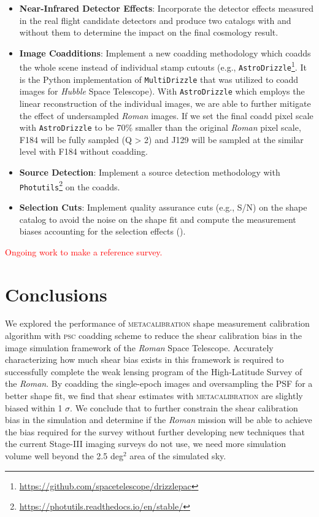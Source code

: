 {\begin{itemize}
    \item \textbf{Near-Infrared Detector Effects}: Incorporate the detector effects measured in the real flight candidate detectors and produce two catalogs with and without them to determine the impact on the final cosmology result.
    
    \item \textbf{Image Coadditions}: Implement a new coadding methodology which coadds the whole scene instead of individual stamp cutouts (e.g., \texttt{AstroDrizzle}\footnote{\url{https://github.com/spacetelescope/drizzlepac}}. It is the Python implementation of \texttt{MultiDrizzle} that was utilized to coadd images for \emph{Hubble} Space Telescope). With \texttt{AstroDrizzle} which employs the linear reconstruction of the individual images, we are able to further mitigate the effect of undersampled \emph{Roman} images. If we set the final coadd pixel scale with \texttt{AstroDrizzle} to be 70\% smaller than the original \emph{Roman} pixel scale, F184 will be fully sampled (Q > 2) and J129 will be sampled at the similar level with F184 without coadding. 
    
    \item \textbf{Source Detection}: Implement a source detection methodology with \texttt{Photutils}\footnote{\url{https://photutils.readthedocs.io/en/stable/}} on the coadds.
    
    \item \textbf{Selection Cuts}: Implement quality assurance cuts (e.g., S/N) on the shape catalog to avoid the noise on the shape fit and compute the measurement biases accounting for the selection effects (\citealt{2017ApJ...841...24S}). 
\end{itemize}
\textcolor{red}{Ongoing work to make a reference survey. }


\section{Conclusions}
\label{sec:conclusion}
We explored the performance of \textsc{metacalibration} shape measurement calibration algorithm with \textsc{psc} coadding scheme to reduce the shear calibration bias in the image simulation framework of the \emph{Roman} Space Telescope. Accurately characterizing how much shear bias exists in this framework is required to successfully complete the weak lensing program of the High-Latitude Survey of the \emph{Roman}. By coadding the single-epoch images and oversampling the PSF for a better shape fit, we find that shear estimates with \textsc{metacalibration} are slightly biased within 1 $\sigma$. We conclude that to further constrain the shear calibration bias in the simulation and determine if the \emph{Roman} mission will be able to achieve the bias required for the survey without further developing new techniques that the current Stage-III imaging surveys do not use, we need more simulation volume well beyond the 2.5 deg$^{2}$ area of the simulated sky. 



}
